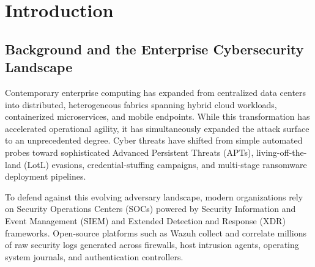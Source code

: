 \chapter{Introduction}
\label{ch:introduction}

\section{Background and the Enterprise Cybersecurity Landscape}
\label{sec:cyber_background}
Contemporary enterprise computing has expanded from centralized data centers into distributed, heterogeneous fabrics spanning hybrid cloud workloads, containerized microservices, and mobile endpoints. While this transformation has accelerated operational agility, it has simultaneously expanded the attack surface to an unprecedented degree. Cyber threats have shifted from simple automated probes toward sophisticated Advanced Persistent Threats (APTs), living-off-the-land (LotL) evasions, credential-stuffing campaigns, and multi-stage ransomware deployment pipelines. 

To defend against this evolving adversary landscape, modern organizations rely on Security Operations Centers (SOCs) powered by Security Information and Event Management (SIEM) and Extended Detection and Response (XDR) frameworks. Open-source platforms such as Wazuh collect and correlate millions of raw security logs generated across firewalls, host intrusion agents, operating system journals, and authentication controllers.

